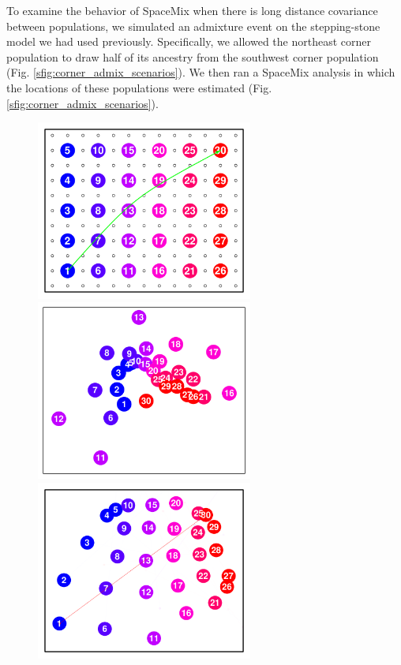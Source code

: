 \documentclass[12pt]{article}
\begin{document}
To examine the behavior of SpaceMix when there is long distance covariance between populations, we simulated an admixture event on the stepping-stone model we had used previously.  Specifically, we allowed the northeast corner population to draw half of its ancestry from the southwest corner population (Fig. \ref{sfig:corner_admix_scenarios}).  We then ran a SpaceMix analysis in which the locations of these populations were estimated (Fig. \ref{sfig:corner_admix_scenarios}).

\begin{figure}
	\centering
			{\includegraphics[width=2.8in,height=2.33in]{figs/sims/corner_admixture_lattice.pdf}}
			{\includegraphics[width=2.8in,height=2.33in]{figs/sims/GeoGenMap_corner_admixture_CYOL.pdf}}
			{\includegraphics[width=2.8in,height=2.33in]{figs/sims/GeoGenMap_corner_admixture.pdf}}

\end{figure}
\end{document}

